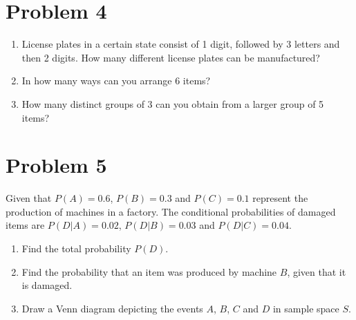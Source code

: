 \documentclass[12pt,twoside]{article}
\newcommand{\pts}[1]{\marginpar{ \small\hspace{0pt} \textit{[#1]} } }
\newcommand{\?}{\stackrel{?}{=}}
\begin{document}
\begin{enumerate}[\bf (a)]
  
\end{enumerate}

\eject

\section*{Problem 4 }



\begin{enumerate}[\bf (a)]
\item License plates in a certain state consist of \pts{3} 1 digit, followed by 3 letters and then 2 digits. How many different
license plates can be manufactured?
\vspace{40ex}

\item In how many ways can you arrange 6 items? \pts{2}
\vspace{20ex}

\item How many distinct groups of 3 can you obtain from a larger group of 5 items? \pts{2}
\vspace{40ex}
  
\end{enumerate}



\eject
\section*{Problem 5 }
Given that $P (A) = 0.6$, $P (B) = 0.3$ and $P(C) = 0.1$ represent the production of machines in a
factory. The conditional probabilities of damaged items are $P(D|A) = 0.02$, $P (D|B) = 0.03$ and
$P (D|C) = 0.04$.

\begin{enumerate}[\bf (a)]
\item Find the total probability $P(D)$. \pts{3}
    \vspace{25ex}

  \item Find the \pts{3} probability that an item was produced by machine $B$, given that it is damaged.
    \vspace{25ex}

  \item Draw a Venn \pts{3} diagram depicting the  events $A$, $B$, $C$ and $D$ in sample space $S$.
    

\end{enumerate}
\end{document}
